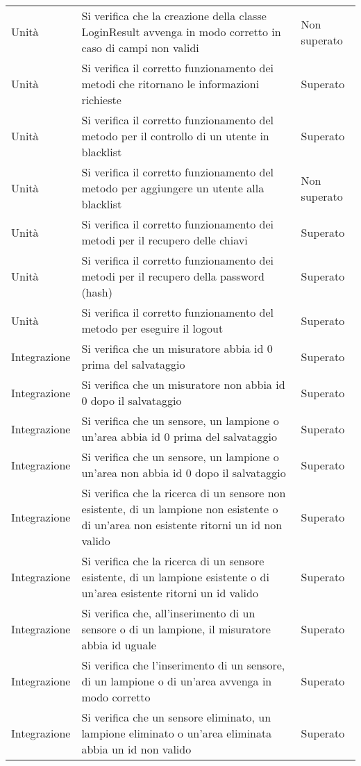 \begin{center}
\begin{xltabular}{\linewidth}{|l|X|l|}
        Unità & Si verifica che la creazione della classe LoginResult avvenga in modo corretto in caso di campi non validi & Non superato\\
        Unità & Si verifica il corretto funzionamento dei metodi che ritornano le informazioni richieste & Superato\\
        Unità & Si verifica il corretto funzionamento del metodo per il controllo di un utente in blacklist & Superato\\
        Unità & Si verifica il corretto funzionamento del metodo per aggiungere un utente alla blacklist & Non superato\\
        Unità & Si verifica il corretto funzionamento dei metodi per il recupero delle chiavi & Superato\\
        Unità & Si verifica il corretto funzionamento dei metodi per il recupero della password (hash) & Superato\\
        Unità & Si verifica il corretto funzionamento del metodo per eseguire il logout & Superato\\
        \hline
        Integrazione & Si verifica che un misuratore abbia id 0 prima del salvataggio & Superato\\
        Integrazione & Si verifica che un misuratore non abbia id 0 dopo il salvataggio & Superato\\
        Integrazione & Si verifica che un sensore, un lampione o un'area abbia id 0 prima del salvataggio & Superato\\
        Integrazione & Si verifica che un sensore, un lampione o un'area non abbia id 0 dopo il salvataggio & Superato\\
        Integrazione & Si verifica che la ricerca di un sensore non esistente, di un lampione non esistente o di un'area non esistente ritorni un id non valido & Superato\\
        Integrazione & Si verifica che la ricerca di un sensore esistente, di un lampione esistente o di un'area esistente ritorni un id valido & Superato\\
        Integrazione & Si verifica che, all'inserimento di un sensore o di un lampione, il misuratore abbia id uguale & Superato\\
        Integrazione & Si verifica che l'inserimento di un sensore, di un lampione o di un'area avvenga in modo corretto & Superato\\
        Integrazione & Si verifica che un sensore eliminato, un lampione eliminato o un'area eliminata abbia un id non valido & Superato\\

\end{xltabular}
\end{center}
